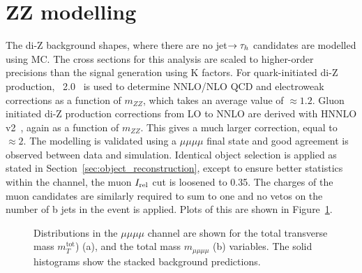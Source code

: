 \section{ZZ modelling}
\label{sec:zz_modelling}

The di-Z background shapes, where there are no jet$\rightarrow \tau_{h}$ candidates are modelled using \ac{MC}.
The cross sections for this analysis are scaled to higher-order precisions than the signal generation using K factors.
For quark-initiated di-Z production, \POWHEG~2.0~\cite{Nason:2004rx,Frixione:2007vw,Alioli:2010xd,Jezo:2015aia} is used to determine \ac{NNLO}/\ac{NLO} \ac{QCD} and electroweak corrections as a function of $m_{ZZ}$, which takes an average value of $\approx 1.2$.
Gluon initiated di-Z production corrections from \ac{LO} to \ac{NNLO} are derived with HNNLO v2~\cite{PhysRevLett.98.222002}, again as a function of $m_{ZZ}$.
This gives a much larger correction, equal to $\approx 2$.
The modelling is validated using a $\mu\mu\mu\mu$ final state and good agreement is observed between data and simulation.
Identical object selection is applied as stated in Section~\ref{sec:object_reconstruction}, except to ensure better statistics within the channel, the muon $I_{\text{rel}}$ cut is loosened to 0.35.
The charges of the muon candidates are similarly required to sum to one and no vetos on the number of b jets in the event is applied.
Plots of this are shown in Figure~\ref{fig:4tau_mmmm}. \\

\begin{figure}[!hbtp]
\centering
\caption{Distributions in the $\mu\mu\mu\mu$ channel are shown for the total transverse mass $m_{T}^{\text{tot}}$) (a), and the total mass $m_{\mu\mu\mu\mu}$ (b) variables. The solid histograms show the stacked background predictions.}
\label{fig:4tau_mmmm}
\end{figure}


